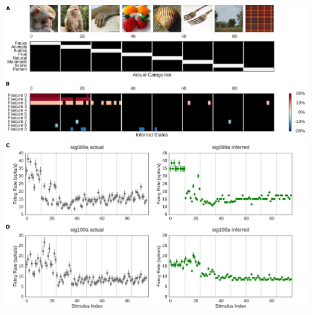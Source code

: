 \documentclass[12pt]{article}
\begin{document}
\includegraphics[width=6in]{../plos2016/figures/imgclust.pdf}
\end{document}
